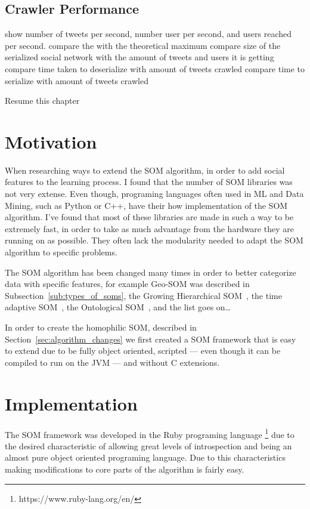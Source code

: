 \subsection{Crawler Performance}
\label{sub:crawler_performance}
{\color{red} show number of tweets per second, number user per second, and users reached per second. }
{\color{red} compare the with the theoretical maximum }
{\color{red} compare size of the serialized social network with the amount of tweets and users it is getting  }
{\color{red} compare time taken to deserialize with amount of tweets crawled }
{\color{red} compare time to serialize with amount of tweets crawled }


{\color{red} Resume this chapter }

\section{Motivation}
\label{sec:motivation}
When researching ways to extend the \ac{SOM} algorithm, in order to add social features to the learning process. I found that the number of \ac{SOM} libraries was not very extense. Even though, programing languages often used in \ac{ML} and Data Mining, such as Python or C++, have their how implementation of the \ac{SOM} algorithm. I've found that most of these libraries are made in such a way to be extremely fast, in order to take as much advantage from the hardware they are running on as possible. They often lack the modularity needed to adapt the \ac{SOM} algorithm to specific problems.

The \ac{SOM} algorithm has been changed many times in order to better categorize data with specific features, for example Geo-SOM was described in Subsection~\ref{sub:types_of_soms}, the Growing Hierarchical SOM~\cite[]{1058070}, the time adaptive SOM~\cite[]{1187438}, the Ontological SOM~\cite[]{5446427}, and the list goes on\dots  

In order to create the homophilic SOM, described in Section~\ref{sec:algorithm_changes} we first created a SOM framework that is easy to extend due to be fully object oriented, scripted --- even though it can be compiled to run on the JVM --- and without C extensions.

\section{Implementation}
\label{sec:implementation}
The \ac{SOM} framework was developed in the Ruby programing language \footnote{https://www.ruby-lang.org/en/} due to the desired characteristic of allowing great levels of introspection and being an almost pure object oriented programing language. Due to this characteristics making modifications to core parts of the algorithm is fairly easy.

